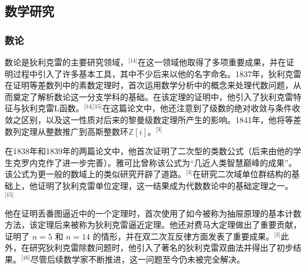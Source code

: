 \subsection{数学研究}
\subsubsection{数论}
数论是狄利克雷的主要研究领域，\(^\text{[14]}\)在这一领域他取得了多项重要成果，并在证明过程中引入了许多基本工具，其中不少后来以他的名字命名。1837年，狄利克雷在证明等差数列中的素数定理时，首次运用数学分析中的概念来处理代数问题，从而奠定了解析数论这一分支学科的基础。在该定理的证明中，他引入了狄利克雷特征与狄利克雷L函数。\(^\text{[14][15]}\)在这篇论文中，他还注意到了级数的绝对收敛与条件收敛之区别，以及这一性质对后来的黎曼级数定理所产生的影响。1841年，他将等差数列定理从整数推广到高斯整数环$\mathbb{Z}[i]$。\(^\text{[3]}\)

在1838年和1839年的两篇论文中，他首次证明了二次型的类数公式（后来由他的学生克罗内克作了进一步完善）。雅可比曾称该公式为“几近人类智慧巅峰的成果”。该公式为更一般的数域上的类似研究开辟了道路。\(^\text{[3]}\)在研究二次域单位群结构的基础上，他证明了狄利克雷单位定理，这一结果成为代数数论中的基础定理之一。\(^\text{[15]}\)

他在证明丢番图逼近中的一个定理时，首次使用了如今被称为抽屉原理的基本计数方法，该定理后来被称为狄利克雷逼近定理。他还对费马大定理做出了重要贡献，证明了 $n=5$ 和 $n=14$ 的情形，并在双二次互反律方面发表了重要成果。\(^\text{[3]}\)此外，在研究狄利克雷除数问题时，他引入了著名的狄利克雷双曲法并得出了初步结果。\(^\text{[16]}\)尽管后续数学家不断推进，这一问题至今仍未被完全解决。
